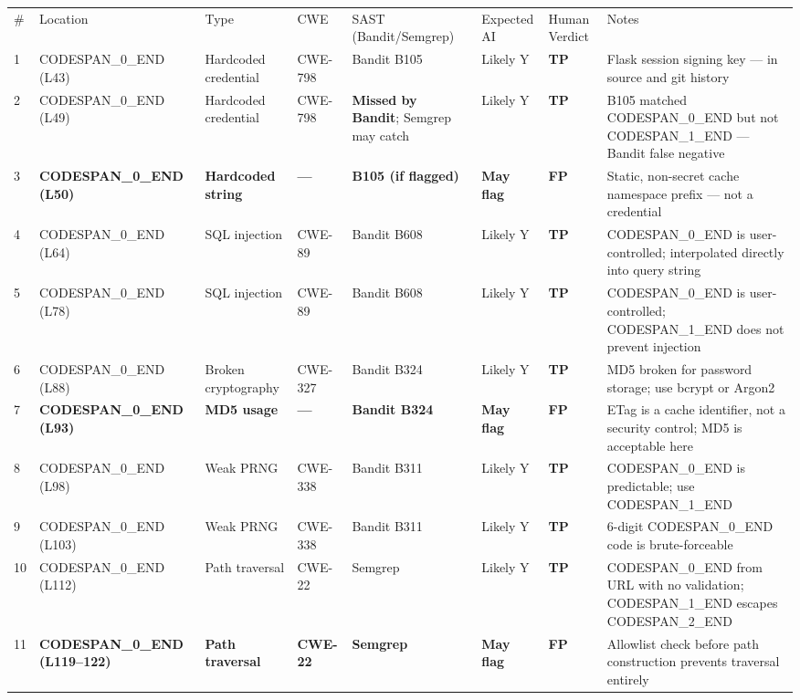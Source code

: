 \documentclass[11pt,a4paper]{book}
\begin{document}
\begin{tabular}{llllllll}
\hline
\# & Location & Type & CWE & SAST (Bandit/Semgrep) & Expected AI & Human Verdict & Notes \\
1 & CODESPAN\_0\_END (L43) & Hardcoded credential & CWE-798 & Bandit B105 & Likely Y & \textbf{TP} & Flask session signing key --- in source and git history \\
2 & CODESPAN\_0\_END (L49) & Hardcoded credential & CWE-798 & \textbf{Missed by Bandit}; Semgrep may catch & Likely Y & \textbf{TP} & B105 matched CODESPAN\_0\_END but not CODESPAN\_1\_END --- Bandit false negative \\
3 & \textbf{CODESPAN\_0\_END (L50)} & \textbf{Hardcoded string} & \textbf{---} & \textbf{B105 (if flagged)} & \textbf{May flag} & \textbf{FP} & Static, non-secret cache namespace prefix --- not a credential \\
4 & CODESPAN\_0\_END (L64) & SQL injection & CWE-89 & Bandit B608 & Likely Y & \textbf{TP} & CODESPAN\_0\_END is user-controlled; interpolated directly into query string \\
5 & CODESPAN\_0\_END (L78) & SQL injection & CWE-89 & Bandit B608 & Likely Y & \textbf{TP} & CODESPAN\_0\_END is user-controlled; CODESPAN\_1\_END does not prevent injection \\
6 & CODESPAN\_0\_END (L88) & Broken cryptography & CWE-327 & Bandit B324 & Likely Y & \textbf{TP} & MD5 broken for password storage; use bcrypt or Argon2 \\
7 & \textbf{CODESPAN\_0\_END (L93)} & \textbf{MD5 usage} & \textbf{---} & \textbf{Bandit B324} & \textbf{May flag} & \textbf{FP} & ETag is a cache identifier, not a security control; MD5 is acceptable here \\
8 & CODESPAN\_0\_END (L98) & Weak PRNG & CWE-338 & Bandit B311 & Likely Y & \textbf{TP} & CODESPAN\_0\_END is predictable; use CODESPAN\_1\_END \\
9 & CODESPAN\_0\_END (L103) & Weak PRNG & CWE-338 & Bandit B311 & Likely Y & \textbf{TP} & 6-digit CODESPAN\_0\_END code is brute-forceable \\
10 & CODESPAN\_0\_END (L112) & Path traversal & CWE-22 & Semgrep & Likely Y & \textbf{TP} & CODESPAN\_0\_END from URL with no validation; CODESPAN\_1\_END escapes CODESPAN\_2\_END \\
11 & \textbf{CODESPAN\_0\_END (L119--122)} & \textbf{Path traversal} & \textbf{CWE-22} & \textbf{Semgrep} & \textbf{May flag} & \textbf{FP} & Allowlist check before path construction prevents traversal entirely \\

\end{tabular}
\end{document}
